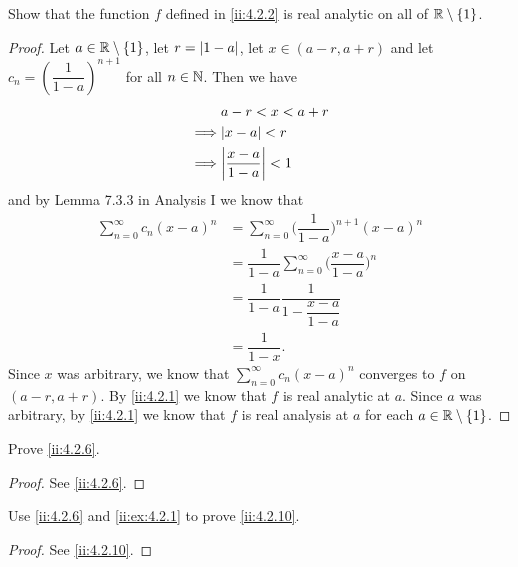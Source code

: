 \begin{ex}\label{ii:ex:4.2.2}
  Show that the function \(f\) defined in \cref{ii:4.2.2} is real analytic on all of \(\mathbb{R} \setminus \left\lbrace1\right\rbrace\).
\end{ex}

\begin{proof}
  Let \(a \in \mathbb{R} \setminus \left\lbrace1\right\rbrace\), let \(r = \left\lvert1 - a\right\rvert\), let \(x \in (a - r, a + r)\) and let \(c_n = (\dfrac{1}{1 - a})^{n + 1}\) for all \(n \in \mathbb{N}\).
  Then we have
  \begin{align*}
             & a - r < x < a + r              \\
    \implies & \abs{x - a} < r                \\
    \implies & \abs{\dfrac{x - a}{1 - a}} < 1
  \end{align*}
  and by Lemma 7.3.3 in Analysis I we know that
  \begin{align*}
    \sum_{n = 0}^\infty c_n (x - a)^n & = \sum_{n = 0}^\infty \bigg(\dfrac{1}{1 - a}\bigg)^{n + 1} (x - a)^n      \\
                                      & = \dfrac{1}{1 - a} \sum_{n = 0}^\infty \bigg(\dfrac{x - a}{1 - a}\bigg)^n \\
                                      & = \dfrac{1}{1 - a} \dfrac{1}{1 - \dfrac{x - a}{1 - a}}                    \\
                                      & = \dfrac{1}{1 - x}.
  \end{align*}
  Since \(x\) was arbitrary, we know that \(\sum_{n = 0}^\infty c_n (x - a)^n\) converges to \(f\) on \((a - r, a + r)\).
  By \cref{ii:4.2.1} we know that \(f\) is real analytic at \(a\).
  Since \(a\) was arbitrary, by \cref{ii:4.2.1} we know that \(f\) is real analysis at \(a\) for each \(a \in \mathbb{R} \setminus \left\lbrace1\right\rbrace\).
\end{proof}

\begin{ex}\label{ii:ex:4.2.3}
  Prove \cref{ii:4.2.6}.
\end{ex}

\begin{proof}
  See \cref{ii:4.2.6}.
\end{proof}

\begin{ex}\label{ii:ex:4.2.4}
  Use \cref{ii:4.2.6} and \cref{ii:ex:4.2.1} to prove \cref{ii:4.2.10}.
\end{ex}

\begin{proof}
  See \cref{ii:4.2.10}.
\end{proof}

